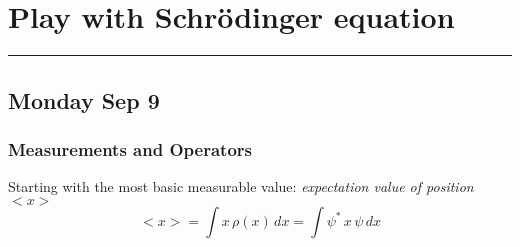 \section{Play with Schrödinger equation}
\vspace{-15pt}\noindent\rule{\textwidth}{0.1pt}\vspace{-10pt}
    \subsection{\hfill \small Monday Sep 9}
    \subsubsection*{Measurements and Operators}
    Starting with the most basic measurable value: \textit{expectation value of position} $<x>$
    \[
        <x> = \int x\,\rho(x)\,dx = \int \psi^*\,x\,\psi\,dx
    \]

